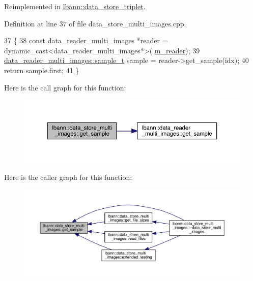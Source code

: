 Reimplemented in \hyperlink{classlbann_1_1data__store__triplet_ade5d2290c85e7916e828553f4ab4f379}{lbann\+::data\+\_\+store\+\_\+triplet}.



Definition at line 37 of file data\+\_\+store\+\_\+multi\+\_\+images.\+cpp.


\begin{DoxyCode}
37                                                                          \{
38   \textcolor{keyword}{const} data\_reader\_multi\_images *reader = \textcolor{keyword}{dynamic\_cast<}data\_reader\_multi\_images*\textcolor{keyword}{>}(
      \hyperlink{classlbann_1_1generic__data__store_afa49ced0ab64c632371ea52532a91ec2}{m\_reader});
39   \hyperlink{classlbann_1_1data__reader__multi__images_a6cbb30001dd633b0d810c417cbbf441e}{data\_reader\_multi\_images::sample\_t} sample = reader->get\_sample(idx);
40   \textcolor{keywordflow}{return} sample.first;
41 \}   
\end{DoxyCode}
Here is the call graph for this function\+:\nopagebreak
\begin{figure}[H]
\begin{center}
\leavevmode
\includegraphics[width=350pt]{classlbann_1_1data__store__multi__images_a39108690484fe407efafefe6a4b0947b_cgraph}
\end{center}
\end{figure}
Here is the caller graph for this function\+:\nopagebreak
\begin{figure}[H]
\begin{center}
\leavevmode
\includegraphics[width=350pt]{classlbann_1_1data__store__multi__images_a39108690484fe407efafefe6a4b0947b_icgraph}
\end{center}
\end{figure}
\mbox{\label{classlbann_1_1data__store__multi__images_a68962dc0416b572443953bea392439b1}} 
